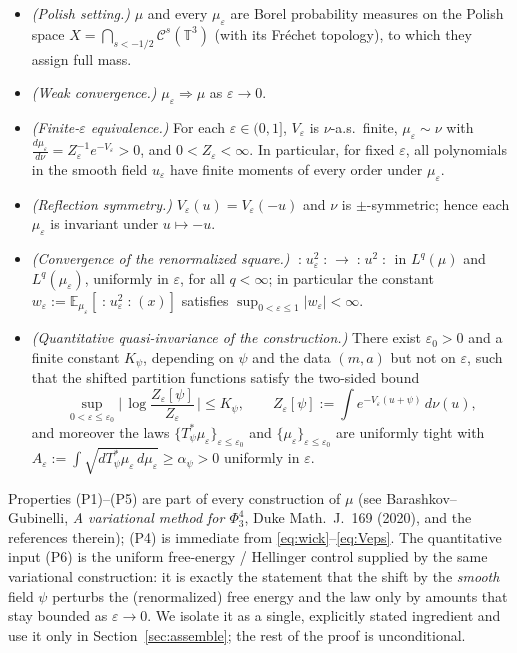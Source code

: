 \documentclass[12pt]{article}
\newcommand{\bT}{\mathbb{T}}
\newcommand{\bE}{\mathbb{E}}
\newcommand{\eps}{\varepsilon}
\newcommand{\Wick}[1]{\mathopen{:}#1\mathclose{:}}
\theoremstyle{plain}
\theoremstyle{definition}
\begin{document}
\begin{itemize}
\item[(P1)] \emph{(Polish setting.)} $\mu$ and every $\mu_\eps$ are Borel probability
measures on the Polish space $X=\bigcap_{s<-1/2}\mathcal{C}^{s}(\bT^3)$ (with its
Fr\'echet topology), to which they assign full mass.
\item[(P2)] \emph{(Weak convergence.)} $\mu_\eps\Rightarrow\mu$ as $\eps\to0$.
\item[(P3)] \emph{(Finite-$\eps$ equivalence.)} For each $\eps\in(0,1]$, $V_\eps$ is
$\nu$-a.s.\ finite, $\mu_\eps\sim\nu$ with $\frac{d\mu_\eps}{d\nu}=Z_\eps^{-1}e^{-V_\eps}>0$,
and $0<Z_\eps<\infty$. In particular, for fixed $\eps$, all polynomials in the smooth
field $u_\eps$ have finite moments of every order under $\mu_\eps$.
\item[(P4)] \emph{(Reflection symmetry.)} $V_\eps(u)=V_\eps(-u)$ and $\nu$ is
$\pm$-symmetric; hence each $\mu_\eps$ is invariant under $u\mapsto-u$.
\item[(P5)] \emph{(Convergence of the renormalized square.)} $\Wick{u_\eps^2}\to\Wick{u^2}$
in $L^q(\mu)$ and $L^q(\mu_\eps)$, uniformly in $\eps$, for all $q<\infty$; in
particular the constant $w_\eps:=\bE_{\mu_\eps}[\Wick{u_\eps^2}(x)]$ satisfies
$\sup_{0<\eps\le1}|w_\eps|<\infty$.
\item[(P6)] \emph{(Quantitative quasi-invariance of the construction.)} There exist
$\eps_0>0$ and a finite constant $K_\psi$, depending on $\psi$ and the data
$(m,a)$ but not on $\eps$, such that the shifted partition functions satisfy the
two-sided bound
\begin{equation}\label{eq:P6}
\sup_{0<\eps\le\eps_0}\Big|\,\log\frac{Z_\eps[\psi]}{Z_\eps}\,\Big|\le K_\psi,
\qquad Z_\eps[\psi]:=\int e^{-V_\eps(u+\psi)}\,d\nu(u),
\end{equation}
and moreover the laws $\{T_\psi^*\mu_\eps\}_{\eps\le\eps_0}$ and
$\{\mu_\eps\}_{\eps\le\eps_0}$ are uniformly tight with $A_\eps:=\int\sqrt{dT_\psi^*\mu_\eps\,d\mu_\eps}\ge \alpha_\psi>0$
uniformly in $\eps$.
\end{itemize}
Properties (P1)--(P5) are part of every construction of $\mu$ (see Barashkov--Gubinelli,
\emph{A variational method for $\Phi^4_3$}, Duke Math.\ J.\ 169 (2020), and the
references therein); (P4) is immediate from \eqref{eq:wick}--\eqref{eq:Veps}. The
quantitative input (P6) is the uniform free-energy / Hellinger control supplied by
the same variational construction: it is exactly the statement that the shift by the
\emph{smooth} field $\psi$ perturbs the (renormalized) free energy and the law only
by amounts that stay bounded as $\eps\to0$. We isolate it as a single, explicitly
stated ingredient and use it only in Section~\ref{sec:assemble}; the rest of the
proof is unconditional.
\end{document}
